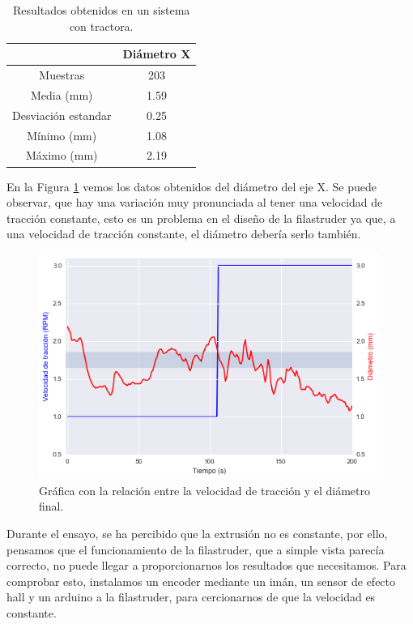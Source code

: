 \begin{table}[H]
    \centering
    \begin{tabular}{cc}
                   & Diámetro X \\ \hline
        Muestras    & 203        \\
        Media (mm) & 1.59       \\
        Desviación estandar & 0.25\\
        Mínimo (mm)   & 1.08       \\
        Máximo (mm)   & 2.19      
    \end{tabular}
    \caption{Resultados obtenidos en un sistema con tractora.}
    \label{tab:20007105-dat}
\end{table}

En la Figura \ref{fig:2007105-graf} vemos los datos obtenidos del diámetro del eje X. Se puede observar, que hay una variación muy pronunciada al tener una velocidad de tracción constante, esto es un problema en el diseño de la filastruder ya que, a una velocidad de tracción constante, el diámetro debería serlo también.

\begin{figure}[H]
    \centering
    \includegraphics[width=0.99\textwidth]{images/producciones/20072015/output_8_0.png}
    \caption[Gráfica con la relación entre la velocidad de tracción y el diámetro final.]{Gráfica con la relación entre la velocidad de tracción y el diámetro final.}
    \label{fig:2007105-graf}
\end{figure}

 Durante el ensayo, se ha percibido que la extrusión no es constante, por ello, pensamos que el funcionamiento de la filastruder, que a simple vista parecía correcto, no puede llegar a proporcionarnos los resultados que necesitamos. Para comprobar esto, instalamos un encoder mediante un imán, un sensor de efecto hall y un arduino a la filastruder, para cercionarnos de que la velocidad es constante.

